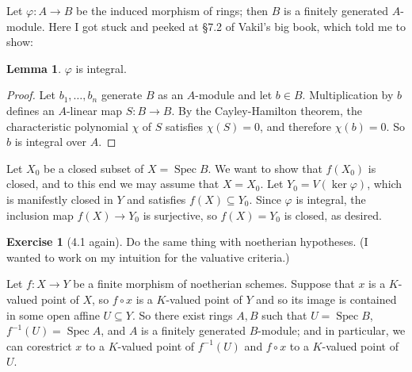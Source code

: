 \documentclass[10pt]{article}
\newcommand{\Spec}{\operatorname{Spec}}
\theoremstyle{definition}
\newtheorem{exer}{Exercise}
\newtheorem{lemma}{Lemma}[exer]
\begin{document}
Let $\varphi: A \to B$ be the induced morphism of rings; then $B$ is a finitely generated $A$-module.
Here I got stuck and peeked at \S7.2 of Vakil's big book, which told me to show:

\begin{lemma}
$\varphi$ is integral.
\end{lemma}
\begin{proof}
Let $b_1, \dots, b_n$ generate $B$ as an $A$-module and let $b \in B$.
Multiplication by $b$ defines an $A$-linear map $S: B \to B$.
By the Cayley-Hamilton theorem, the characteristic polynomial $\chi$ of $S$ satisfies $\chi(S) = 0$, and therefore $\chi(b) = 0$.
So $b$ is integral over $A$.
\end{proof}

Let $X_0$ be a closed subset of $X = \Spec B$.
We want to show that $f(X_0)$ is closed, and to this end we may assume that $X = X_0$.
Let $Y_0 = V(\ker \varphi)$, which is manifestly closed in $Y$ and satisfies $f(X) \subseteq Y_0$.
Since $\varphi$ is integral, the inclusion map $f(X) \to Y_0$ is surjective, so $f(X) = Y_0$ is closed, as desired.

\begin{exer}[4.1 again]
Do the same thing with noetherian hypotheses.
(I wanted to work on my intuition for the valuative criteria.)
\end{exer}

Let $f: X \to Y$ be a finite morphism of noetherian schemes.
Suppose that $x$ is a $K$-valued point of $X$, so $f \circ x$ is a $K$-valued point of $Y$ and so its image is contained in some open affine $U \subseteq Y$.
So there exist rings $A, B$ such that $U = \Spec B$, $f^{-1}(U) = \Spec A$, and $A$ is a finitely generated $B$-module; and in particular, we can corestrict $x$ to a $K$-valued point of $f^{-1}(U)$ and $f \circ x$ to a $K$-valued point of $U$.
\end{document}
